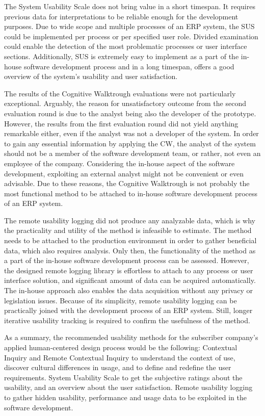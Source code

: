 \documentclass[12pt,a4paper,oneside,pdftex]{report}
\begin{document}
The System Usability Scale does not bring value in a short timespan. It requires previous data for interpretations to be reliable enough for the development purposes. Due to wide scope and multiple processes of an ERP system, the SUS could be implemented per process or per specified user role. Divided examination could enable the detection of the most problematic processes or user interface sections. Additionally, SUS is extremely easy to implement as a part of the in-house software development process and in a long timespan, offers a good overview of the system's usability and user satisfaction. 

The results of the Cognitive Walktrough evaluations were not particularly exceptional. Arguably, the reason for unsatisfactory outcome from the second evaluation round is due to the analyst being also the developer of the prototype. However, the results from the first evaluation round did not yield anything remarkable either, even if the analyst was not a developer of the system. In order to gain any essential information by applying the CW, the analyst of the system should not be a member of the software development team, or rather, not even an employee of the company. Considering the in-house aspect of the software development, exploiting an external analyst might not be convenient or even advisable. Due to these reasons, the Cognitive Walktrough is not probably the most functional method to be attached to in-house software development process of an ERP system. 

The remote usability logging did not produce any analyzable data, which is why the practicality and utility of the method is infeasible to estimate. The method needs to be attached to the production environment in order to gather beneficial data, which also requires analysis. Only then, the functionality of the method as a part of the in-house software development process can  be assessed. However, the designed remote logging library is effortless to attach to any process or user interface solution, and significant amount of data can be acquired automatically. The in-house approach also enables the data acquisition without any privacy or legislation issues. Because of its simplicity, remote usability logging can be practically joined with the development process of an  ERP system. Still, longer iterative usability tracking is required to confirm the usefulness of the method.

As a summary, the recommended usability methods for the subscriber company's applied human-centered design process would be the following: Contextual Inquiry and Remote Contextual Inquiry to understand the context of use, discover cultural differences in usage, and to define and redefine the user requirements. System Usability Scale to get the subjective ratings about the usability, and an overview about the user satisfaction. Remote usability logging to gather hidden usability, performance and usage data to be exploited in the software development. 
\end{document}
